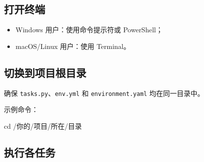 \documentclass[
  letterpaper,
  DIV=11,
  numbers=noendperiod]{scrreprt}
\newenvironment{Shaded}{\begin{snugshade}}{\end{snugshade}}
\newcommand{\BuiltInTok}[1]{\textcolor[rgb]{0.00,0.23,0.31}{#1}}
\newcommand{\NormalTok}[1]{\textcolor[rgb]{0.00,0.23,0.31}{#1}}
\providecommand{\tightlist}{%
  \setlength{\itemsep}{0pt}\setlength{\parskip}{0pt}}\usepackage{longtable,booktabs,array}
\begin{document}
\subsection{打开终端}\label{ux6253ux5f00ux7ec8ux7aef}

\begin{itemize}
\tightlist
\item
  Windows 用户：使用命令提示符或 PowerShell；\\
\item
  macOS/Linux 用户：使用 Terminal。
\end{itemize}

\subsection{切换到项目根目录}\label{ux5207ux6362ux5230ux9879ux76eeux6839ux76eeux5f55}

确保 \texttt{tasks.py}、\texttt{env.yml} 和 \texttt{environment.yaml}
均在同一目录中。

示例命令：

\begin{Shaded}
\begin{Highlighting}[]
\BuiltInTok{cd}\NormalTok{ /你的/项目/所在/目录}
\end{Highlighting}
\end{Shaded}

\subsection{执行各任务}\label{ux6267ux884cux5404ux4efbux52a1}
\end{document}
